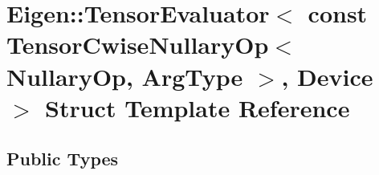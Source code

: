 \hypertarget{struct_eigen_1_1_tensor_evaluator_3_01const_01_tensor_cwise_nullary_op_3_01_nullary_op_00_01_arg_type_01_4_00_01_device_01_4}{}\section{Eigen\+:\+:Tensor\+Evaluator$<$ const Tensor\+Cwise\+Nullary\+Op$<$ Nullary\+Op, Arg\+Type $>$, Device $>$ Struct Template Reference}
\label{struct_eigen_1_1_tensor_evaluator_3_01const_01_tensor_cwise_nullary_op_3_01_nullary_op_00_01_arg_type_01_4_00_01_device_01_4}
\subsection*{Public Types}
